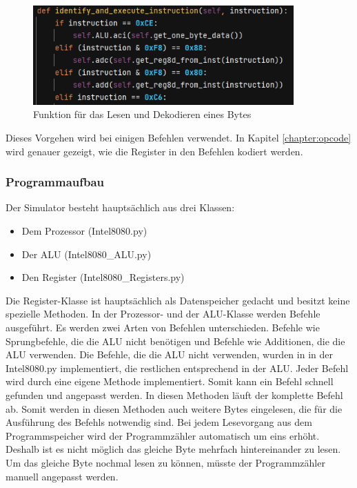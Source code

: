 \documentclass[12pt]{article}
\begin{document}
\begin{figure}[h]
\centering
\includegraphics[width=10cm]{Bilder/ReadInstruction}
\caption{Funktion für das Lesen und Dekodieren eines Bytes}
\label{fig:ReadInstruction}
\end{figure}

\noindent
Dieses Vorgehen wird bei einigen Befehlen verwendet. In Kapitel \ref{chapter:opcode} wird genauer gezeigt, wie die Register in den Befehlen kodiert werden.

\newpage

\subsubsection{Programmaufbau}
\label{chapter:MPS_aufbau}

Der Simulator besteht hauptsächlich aus drei Klassen:

\begin{itemize}
\item Dem Prozessor (Intel8080.py)
\item Der ALU (Intel8080\_ALU.py)
\item Den Register (Intel8080\_Registers.py)
\end{itemize} 

\noindent
Die Register-Klasse ist hauptsächlich als Datenspeicher gedacht und besitzt keine spezielle Methoden. In der Prozessor- und der ALU-Klasse werden Befehle ausgeführt. Es werden zwei Arten von Befehlen unterschieden. Befehle wie Sprungbefehle, die die ALU nicht benötigen und Befehle wie Additionen, die die ALU verwenden. 
Die Befehle, die die ALU nicht verwenden, wurden in in der Intel8080.py implementiert, die restlichen entsprechend in der ALU. Jeder Befehl wird durch eine eigene Methode implementiert. Somit kann ein Befehl schnell gefunden und angepasst werden. In diesen Methoden läuft der komplette Befehl ab. Somit werden in diesen Methoden auch weitere Bytes eingelesen, die für die Ausführung des Befehls notwendig sind.
Bei jedem Lesevorgang aus dem Programmspeicher wird der Programmzähler automatisch um eins erhöht. Deshalb ist es nicht möglich das gleiche Byte mehrfach hintereinander zu lesen. Um das gleiche Byte nochmal lesen zu können, müsste der Programmzähler manuell angepasst werden.
\end{document}

